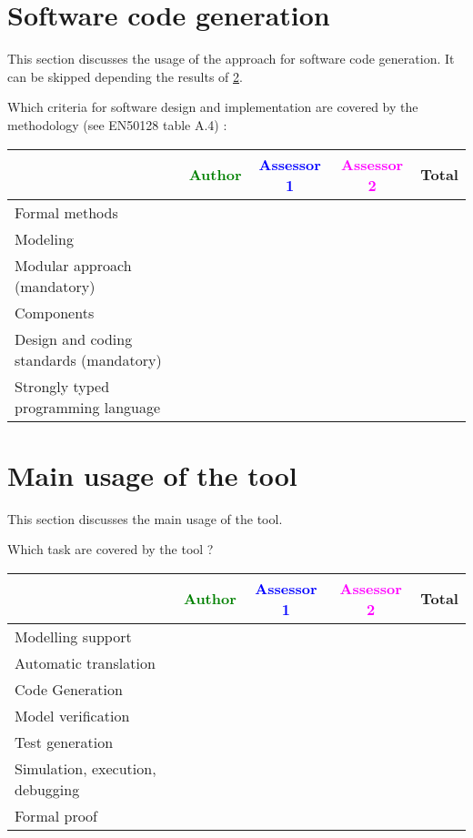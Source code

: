 \section{Software code generation}
This section discusses the usage of the approach for software code generation.
It can be skipped depending the results of \ref{main_usage}.

Which criteria for software design and implementation are covered by the methodology
(see EN50128 table A.4) :

\begin{tabular}{|l | c | c | c | c|}
\hline
& \textcolor{green}{Author} & \textcolor{blue}{Assessor 1} & \textcolor{magenta}{Assessor 2} & Total \\
\hline
Formal methods  & & & &  \\
\hline 
Modeling  & & & &  \\
\hline
Modular approach (mandatory) & & & &  \\
\hline
Components & & & &  \\
\hline
Design and coding standards (mandatory) & & & &  \\
\hline
Strongly typed programming language & & & &  \\
\hline

\end{tabular}



\section{Main usage of the tool}
\label{main_usage}

This section discusses the main usage of the tool.

Which task are covered by the tool ?


\begin{tabular}{|l | c | c | c | c|}
\hline
& \textcolor{green}{Author} & \textcolor{blue}{Assessor 1} & \textcolor{magenta}{Assessor 2} & Total \\
\hline 
Modelling support & & & &  \\
\hline
Automatic translation  & & & & \\
\hline
Code Generation  & & & & \\
\hline
Model verification & & & & \\
\hline
Test generation & & & & \\
\hline
Simulation, execution, debugging & & & & \\
\hline
Formal proof & & & & \\
\hline
\end{tabular}

